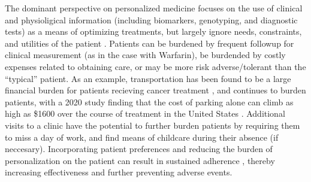 The dominant perspective on personalized medicine focuses on the use of clinical and physioligical information (including biomarkers, genotyping, and diagnostic tests) as a means of optimizing treatments, but largely ignore needs, constraints, and utilities of the patient \cite{rogowski2015concepts, di2017personalized}. Patients can be burdened by frequent followup for clinical measurement (as in the case with Warfarin), be burdended by costly expenses related to obtaining care, or may be more risk adverse/tolerant than the ``typical'' patient. As an example, transportation has been found to be a large financial burden for patients recieving cancer treatment \cite{houts1984nonmedical}, and continues to burden patients, with a 2020 study finding that the cost of parking alone can climb as high as \$1600 over the course of treatment in the United States \cite{lee2020assessment}.  Additional visits to a clinic have the potential to further burden patients by requiring them to miss a day of work, and find means of childcare during their absence (if neccesary). Incorporating patient preferences and reducing the burden of personalization on the patient can result in sustained adherence \cite{elliott2008understanding}, thereby increasing effectiveness and further preventing adverse events.



